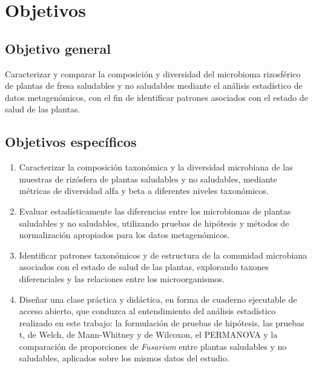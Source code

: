 \chapter{Objetivos}
\label{Objetivos}

\section{Objetivo general}

Caracterizar y comparar la composición y diversidad del microbioma rizosférico de plantas de fresa saludables y no saludables mediante el análisis estadístico de datos metagenómicos, con el fin de identificar patrones asociados con el estado de salud de las plantas.

\section{Objetivos específicos}

\begin{enumerate}
    \item Caracterizar la composición taxonómica y la diversidad microbiana de las muestras de rizósfera de plantas saludables y no saludables, mediante métricas de diversidad alfa y beta a diferentes niveles taxonómicos.

    \item Evaluar estadísticamente las diferencias entre los microbiomas de plantas saludables y no saludables, utilizando pruebas de hipótesis y métodos de normalización apropiados para los datos metagenómicos.

    \item Identificar patrones taxonómicos y de estructura de la comunidad microbiana asociados con el estado de salud de las plantas, explorando taxones diferenciales y las relaciones entre los microorganismos.

    \item Diseñar una clase práctica y didáctica, en forma de cuaderno ejecutable de acceso abierto, que conduzca al entendimiento del análisis estadístico realizado en este trabajo: la formulación de pruebas de hipótesis, las pruebas t, de Welch, de Mann-Whitney y de Wilcoxon, el PERMANOVA y la comparación de proporciones de \textit{Fusarium} entre plantas saludables y no saludables, aplicados sobre los mismos datos del estudio.
\end{enumerate}